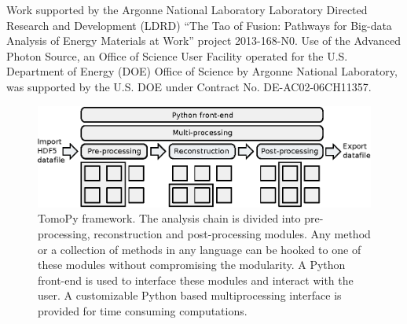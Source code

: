 \documentclass[pdf]{iucr}              %
\begin{document}




Work supported by the Argonne National Laboratory Laboratory Directed Research and Development (LDRD) ``The Tao of Fusion: Pathways for Big-data Analysis of Energy Materials at Work'' project 2013-168-N0. Use of the Advanced Photon Source, an Office of Science User Facility operated for the U.S. Department of Energy (DOE) Office of Science by Argonne National Laboratory, was supported by the U.S. DOE under Contract No. DE-AC02-06CH11357. 





\begin{figure}
\centering
\includegraphics[width=\textwidth]{figs/framework.eps}
\caption{TomoPy framework. The analysis chain is divided into pre-processing, reconstruction and post-processing modules. Any method or a collection of methods in any language can be hooked to one of these modules without compromising the modularity. A Python front-end is used to interface these modules and interact with the user. A customizable Python based multiprocessing interface is provided for time consuming computations.}
\label{fig:Framework}
\end{figure}
\end{document}

